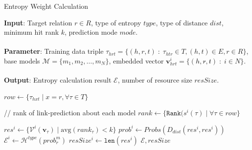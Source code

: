 \documentclass{article}
\begin{document}
\begin{algorithm}[!b]    
    \caption{Entropy Weight Calculation}
    \label{alg:entropy}
    \textbf{Input}: Target relation $r \in R$, type of entropy $\mathit{type}$, type of distance $\mathit{dist}$, minimum hit rank $k$, prediction mode $mode$.\\\\ 
    \textbf{Parameter}: Training data triple $\tau_{hrt} = \{(h, r, t)\;:\; \tau_{htr} \in T, (h, t) \in E, r \in R \}$, base models $\mathcal{M} = \{m_1, m_2, \ldots, m_N\}$, embedded vector $\mathbf{v}_{hrt}^i = \{(h\acute{}, r\acute{}, t\acute{})\;:\; i \in {N}\}$.\\\\
    \textbf{Output}: Entropy calculation result $\mathcal{E}$, number of resource size $resSize$.\\
    \begin{algorithmic}[1] %

        \State $row \leftarrow \{\tau_{hxt}\;|\; x=r, \forall \tau \in T\}$
        
            \vspace{3pt}
            \Statex \hspace*{1em} // rank of link-prediction about each model
            \State $rank \leftarrow \{\mathtt{Rank}(s^i(\tau)\;|\; \forall \tau \in row\}$
            \vspace{3pt}

                \State $res^{i} \leftarrow \{\mathcal{V}^i(\mathbf{v}_{\tau})\;|\;\mathrm{avg}(rank_{\tau}) <k \}$     
            \vspace{3pt}
            \State $prob^{i} \leftarrow Probs(D_{\mathit{dist}}(res^{i}, res^{i}))$
            \vspace{3pt}
            \State $\mathcal{E}^{i} \leftarrow \mathcal{H}^{\mathit{type}}(prob_r^m)$
            \vspace{3pt}
            \State $resSize^{i} \leftarrow \mathtt{len}(res^{i})$  
            \vspace{3pt}
        \EndFor
        \vspace{3pt}
        \State \Return $\mathcal{E}, resSize$
    \end{algorithmic}
\end{algorithm}
\end{document}
